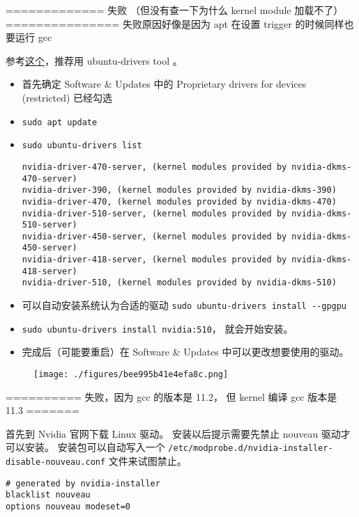 ============= 失败 （但没有查一下为什么 kernel module 加载不了） ===============
失败原因好像是因为 apt 在设置 trigger 的时候同样也要运行 gcc

参考\href{https://ubuntu.com/server/docs/nvidia-drivers-installation}{这个}，推荐用 ubuntu-drivers tool 。

\begin{itemize}
\item 首先确定 Software & Updates 中的 Proprietary drivers for devices (restricted) 已经勾选
\item \verb`sudo apt update`
\item \verb`sudo ubuntu-drivers list`
\begin{lstlisting}[language=none]
nvidia-driver-470-server, (kernel modules provided by nvidia-dkms-470-server)
nvidia-driver-390, (kernel modules provided by nvidia-dkms-390)
nvidia-driver-470, (kernel modules provided by nvidia-dkms-470)
nvidia-driver-510-server, (kernel modules provided by nvidia-dkms-510-server)
nvidia-driver-450-server, (kernel modules provided by nvidia-dkms-450-server)
nvidia-driver-418-server, (kernel modules provided by nvidia-dkms-418-server)
nvidia-driver-510, (kernel modules provided by nvidia-dkms-510)
\end{lstlisting}
\item 可以自动安装系统认为合适的驱动 \verb`sudo ubuntu-drivers install --gpgpu`
\item \verb`sudo ubuntu-drivers install nvidia:510`， 就会开始安装。
\item 完成后（可能要重启）在 Software & Updates 中可以更改想要使用的驱动。
\end{itemize}
\begin{figure}[ht]
\centering
\texttt{[image: ./figures/bee995b41e4efa8c.png]}
\caption{} \label{fig_NvDrUb_1}
\end{figure}




========== 失败，因为 gcc 的版本是 11.2， 但 kernel 编译 gcc 版本是 11.3 =======

首先到 Nvidia 官网下载 Linux 驱动。 安装以后提示需要先禁止 nouveau 驱动才可以安装。 安装包可以自动写入一个 \verb`/etc/modprobe.d/nvidia-installer-disable-nouveau.conf` 文件来试图禁止。
\begin{lstlisting}[language=none,caption=nvidia-installer-disable-nouveau.conf]
# generated by nvidia-installer
blacklist nouveau
options nouveau modeset=0
\end{lstlisting}

